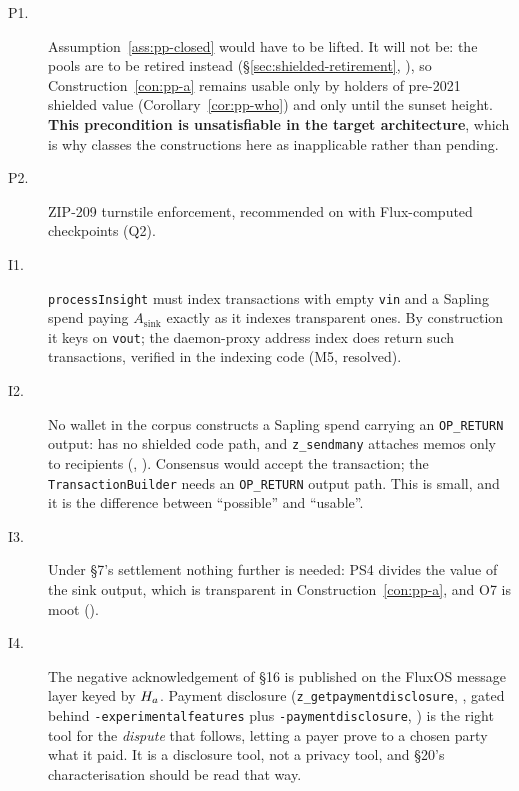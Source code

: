 \begin{description}
  \item[P1.] Assumption~\ref{ass:pp-closed} would have to be lifted. It will not be: the pools are
    to be retired instead (\S\ref{sec:shielded-retirement}, ), so
    Construction~\ref{con:pp-a} remains usable only by holders of pre-2021 shielded value
    (Corollary~\ref{cor:pp-who}) and only until the sunset height. \textbf{This precondition is
    unsatisfiable in the target architecture}, which is why  classes the
    constructions here as inapplicable rather than pending.
  \item[P2.] ZIP-209 turnstile enforcement, recommended on with Flux-computed checkpoints (Q2).
  \item[I1.] \texttt{processInsight} must index transactions with empty \texttt{vin} and a Sapling
    spend paying $A_{\mathrm{sink}}$ exactly as it indexes transparent ones. By construction it keys
    on \texttt{vout}; the daemon-proxy address index does return such transactions, verified in
    the indexing code  (M5, resolved).
  \item[I2.] No wallet in the corpus constructs a Sapling spend carrying an \texttt{OP\_RETURN}
    output: \SSP{} has no shielded code path, and \texttt{z\_sendmany} attaches memos only to
    \zaddr{} recipients (\shipped, ). Consensus
    would accept the transaction; the \texttt{Transaction\allowbreak{}Builder} needs an \texttt{OP\_RETURN} output
    path. This is small, and it is the difference between ``possible'' and ``usable''.
  \item[I3.] Under \S7's settlement nothing further is needed: PS4 divides the value of the sink
    output, which is transparent in Construction~\ref{con:pp-a}, and O7 is moot ().
  \item[I4.] The negative acknowledgement of \S16 is published on the FluxOS message layer keyed by
    $H_{a}$. Payment disclosure (\texttt{z\_getpaymentdisclosure}, \inprogress, gated behind
    \texttt{-\allowbreak{}experimentalfeatures} plus \texttt{-\allowbreak{}paymentdisclosure},
    ) is the right tool for the \emph{dispute}
    that follows, letting a payer prove to a chosen party what it paid. It is a disclosure tool, not a
    privacy tool, and \S20's characterisation should be read that way.
\end{description}

